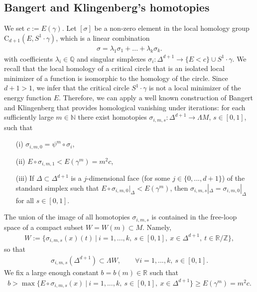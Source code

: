 \documentclass[reqno]{amsart}
\numberwithin{equation}{section}
\theoremstyle{personal}%
\theoremstyle{definition}
\newcommand{\N}{\mathds{N}}
\newcommand{\Z}{\mathds{Z}}
\newcommand{\R}{\mathds{R}}
\newcommand{\Q}{\mathds{Q}}
\newcommand{\Loc}{\mathrm{C}}
\begin{document}
\subsection{Bangert and Klingenberg's homotopies}
We set $c:=E(\gamma)$. Let $[\sigma]$ be a non-zero element in the local homology group $\Loc_{d+1}(E,S^1\cdot\gamma)$, which is a linear combination
\begin{align*}
 \sigma=\lambda_1\sigma_1 +...+ \lambda_k\sigma_k.
\end{align*}
with coefficients $\lambda_i\in\Q$ and singular simplexes $\sigma_i:\Delta^{d+1}\to\{E<c\}\cup S^1\cdot\gamma$. We recall that the local homology of a critical circle that is an isolated local minimizer of a function is isomorphic to the homology of the circle. Since $d+1>1$, we infer that the critical circle $S^1\cdot\gamma$ is not a local minimizer of the energy function $E$. Therefore, we can apply a well known construction of Bangert and Klingenberg \cite[Th.~2]{Bangert:1983ax} that provides homological vanishing under iterations: for each sufficiently large $m\in\N$ there exist homotopies
$\sigma_{i,m,s}:\Delta^{d+1}\to\Lambda M$, $s\in[0,1]$, such that
\begin{itemize}
\item[(i)] $\sigma_{i,m,0}=\psi^m\circ\sigma_i$,
\item[(ii)] $E\circ\sigma_{i,m,1}<E(\gamma^m)=m^2c$,
\item[(iii)] If $\Delta\subset\Delta^{d+1}$ is a $j$-dimensional face (for some $j\in\{0,...,d+1\}$) of the standard simplex such that $E\circ\sigma_{i,m,0}|_{\Delta}<E(\gamma^m)$, then $\sigma_{i,m,s}|_{\Delta}=\sigma_{i,m,0}|_{\Delta}$ for all $s\in[0,1]$.
\end{itemize}
The union of the image of all homotopies $\sigma_{i,m,s}$ is contained in the free-loop space of a compact subset $W=W(m)\subset M$. Namely,
\begin{align*}
W:=
\big\{
\sigma_{i,m,s}(x)(t)
\ \big|\ i=1,...,k,\ s\in[0,1],\ x\in\Delta^{d+1},\ t\in\R/\Z
\big\},
\end{align*}
so that
\begin{align*}
\sigma_{i,m,s}(\Delta^{d+1})\subset \Lambda W,\qquad
\forall i=1,...,k,\ s\in[0,1].
\end{align*}
We fix a large enough constant $b=b(m)\in\R$ such that
\begin{align*}
 b > \max\big\{E\circ\sigma_{i,m,s}(x)\ \big|\ i=1,...,k,\ s\in[0,1],\ x\in\Delta^{d+1}  \big\}
 \geq E(\gamma^m)=m^2c.
\end{align*}
\end{document}
